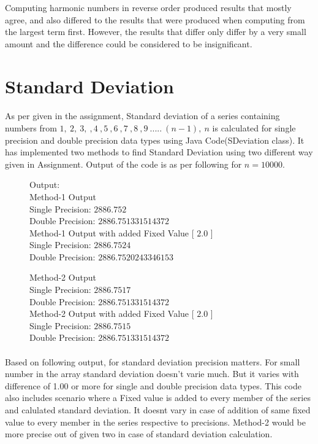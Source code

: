 \documentclass[12pt]{article}
\begin{document}
Computing harmonic numbers in reverse order produced results that mostly agree, and also differed to the results that were produced when computing from the largest term first. However, the results that differ only differ by a very small amount and the difference could be considered to be insignificant.


\section{Standard Deviation}
\paragraph{}
As per given in the assignment, Standard deviation of a series containing numbers from $1, \ 2, \ 3, \ ,4 \ ,5 \ ,6 \ ,7 \ ,8 \ ,9 \ ..... \ (n-1), \ n$ is calculated for single precision and double precision data types using Java Code(SDeviation class). It has implemented two methods to find Standard Deviation using two different way given in Assignment. Output of the code is as per following for $n=10000$.

\begin{figure}[h]
	Output:\\
	Method-1 Output \\
	Single Precision: $2886.752$ \\
	Double Precision: $2886.751331514372$ \\
	Method-1 Output with added Fixed Value [ $2.0$ ] \\
	Single Precision: $2886.7524$ \\
	Double Precision: $2886.7520243346153$
\end{figure}

\begin{figure}[h]
	Method-2 Output \\
	Single Precision: $2886.7517$  \\
	Double Precision: $2886.751331514372$ \\
	Method-2 Output with added Fixed Value [ $2.0$ ] \\
	Single Precision: $2886.7515$ \\
	Double Precision: $2886.751331514372$
\end{figure}

\paragraph{} Based on following output, for standard deviation precision matters. For small number in the array standard deviation doesn't varie much. But it varies with difference of 1.00 or more for single and double precision data types. This code also includes scenario where a Fixed value is added to every member of the series and calulated standard deviation. It doesnt vary in case of addition of same fixed value to every member in the series respective to precisions. Method-2 would be more precise out of given two in case of standard deviation calculation.
\end{document}
